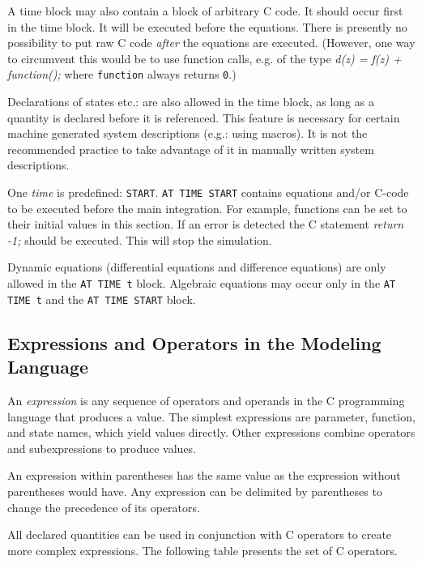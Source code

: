 A time block may also contain a block of arbitrary C code. It should
occur first in the time block. It will be executed before the
equations. There is presently no possibility to put raw C code
\emph{after} the equations are executed. (However, one way to
circumvent this would be to use function calls, e.g. of the type
\emph{d(z) = f(z) + function();} where \texttt{function} always returns
\texttt{0}.)

Declarations of states etc.: are also allowed in the time block, as
long as a quantity is declared before it is referenced. This feature
is necessary for certain machine generated system descriptions (e.g.:
using macros).  It is not the recommended practice to take advantage
of it in manually written system descriptions.

One \emph{time} is predefined: \texttt{START}. \texttt{AT TIME START}
contains equations and/or C-code to be executed before the main
integration. For example, functions can be set to their initial values
in this section. If an error is detected the C statement \emph{return
-1;} should be executed. This will stop the simulation.

Dynamic equations (differential equations and difference equations)
are only allowed in the \texttt{AT TIME t} block. Algebraic equations
may occur only in the \texttt{AT TIME t} and the \texttt{AT TIME START}
block.

\subsection{Expressions and Operators in the Modeling Language}
\label{Expressions and Operators in the System Description Language}

An \emph{expression} is any sequence of operators and operands in the C
programming language that produces a value. The simplest expressions
are parameter, function, and state names, which yield values
directly. Other expressions combine operators and subexpressions to
produce values.

An expression within parentheses has the same value as the expression
without parentheses would have. Any expression can be delimited by
parentheses to change the precedence of its operators.

All declared quantities can be used in conjunction with C operators to
create more complex expressions. The following table presents the set
of C operators.


